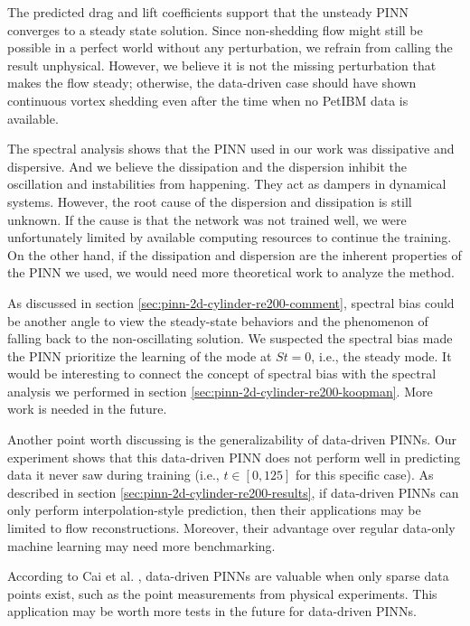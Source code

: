 The predicted drag and lift coefficients support that the unsteady PINN converges to a steady state solution.
Since non-shedding flow might still be possible in a perfect world without any perturbation, we refrain from calling the result unphysical.
However, we believe it is not the missing perturbation that makes the flow steady; otherwise, the data-driven case should have shown continuous vortex shedding even after the time when no PetIBM data is available.

The spectral analysis shows that the PINN used in our work was dissipative and dispersive.
And we believe the dissipation and the dispersion inhibit the oscillation and instabilities from happening.
They act as dampers in dynamical systems.
However, the root cause of the dispersion and dissipation is still unknown.
If the cause is that the network was not trained well, we were unfortunately limited by available computing resources to continue the training.
On the other hand, if the dissipation and dispersion are the inherent properties of the PINN we used, we would need more theoretical work to analyze the method.

As discussed in section \ref{sec:pinn-2d-cylinder-re200-comment}, spectral bias could be another angle to view the steady-state behaviors and the phenomenon of falling back to the non-oscillating solution.
We suspected the spectral bias made the PINN prioritize the learning of the mode at $St=0$, i.e., the steady mode.
It would be interesting to connect the concept of spectral bias with the spectral analysis we performed in section \ref{sec:pinn-2d-cylinder-re200-koopman}.
More work is needed in the future.

Another point worth discussing is the generalizability of data-driven PINNs.
Our experiment shows that this data-driven PINN does not perform well in predicting data it never saw during training (i.e., $t \in [0, 125]$ for this specific case).
As described in section \ref{sec:pinn-2d-cylinder-re200-results}, if data-driven PINNs can only perform interpolation-style prediction, then their applications may be limited to flow reconstructions.
Moreover, their advantage over regular data-only machine learning may need more benchmarking.

According to Cai et al. \cite{cai_physics-informed_2021}, data-driven PINNs are valuable when only sparse data points exist, such as the point measurements from physical experiments.
This application may be worth more tests in the future for data-driven PINNs.

